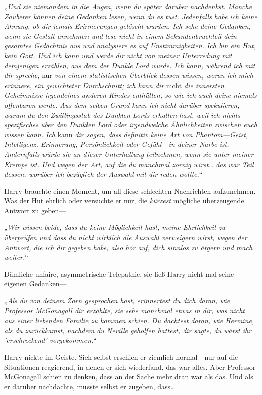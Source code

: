 {„\emph{Und sie niemandem in die Augen, wenn du später darüber nachdenkst. Manche Zauberer können deine Gedanken lesen, wenn du es tust. Jedenfalls habe ich keine Ahnung, ob dir jemals Erinnerungen gelöscht wurden. Ich sehe deine Gedanken, wenn sie Gestalt annehmen und lese nicht in einem Sekundenbruchteil dein gesamtes Gedächtnis aus und analysiere es auf Unstimmigkeiten. Ich bin ein Hut, kein Gott. Und ich kann und werde dir nicht von meiner Unterredung mit demjenigen erzählen, aus dem der Dunkle Lord wurde. Ich kann, während ich mit dir spreche,} nur \emph{von einem statistischen Überblick dessen wissen, woran ich mich erinnere, ein gewichteter Durchschnitt; ich kann dir} nicht \emph{die innersten Geheimnisse irgendeines anderen Kindes enthüllen, so wie ich} \emph{auch deine niemals offenbaren werde. Aus dem selben Grund kann ich nicht darüber spekulieren, warum du den Zwillingsstab des Dunklen Lords erhalten hast, weil ich nichts spezifisches über den Dunklen Lord oder irgendwelche Ähnlichkeiten zwischen euch wissen kann. Ich} kann \emph{dir sagen, dass definitiv keine Art von Phantom—Geist, Intelligenz, Erinnerung, Persönlichkeit oder Gefühl—in deiner Narbe ist. Andernfalls würde sie an dieser Unterhaltung teilnehmen, wenn sie unter meiner Krempe ist. Und wegen der Art, auf die du manchmal zornig wirst… das war Teil dessen, worüber ich bezüglich der Auswahl mit dir reden wollte.}“

Harry brauchte einen Moment, um all diese schlechten Nachrichten aufzunehmen. Was der Hut ehrlich oder versuchte er nur, die \emph{kürzest} mögliche überzeugende Antwort zu geben—

„\emph{Wir wissen beide, dass du keine Möglichkeit hast, meine Ehrlichkeit zu überprüfen und dass du nicht wirklich die Auswahl verweigern wirst, wegen der Antwort, die ich dir gegeben habe, also hör auf, dich sinnlos zu ärgern und mach weiter.}“

Dämliche unfaire, asymmetrische Telepathie, sie ließ Harry nicht mal seine eigenen Gedanken—

„\emph{Als du von deinem Zorn gesprochen hast, erinnertest du dich daran, wie Professor McGonagall dir erzählte, sie sehe manchmal etwas in dir, was nicht aus einer liebenden Familie zu kommen schien. Du dachtest daran, wie Hermine, als du zurückkamst, nachdem du Neville geholfen hattest, dir sagte, du wärst ihr 'erschreckend' vorgekommen.}“

Harry nickte im Geiste. Sich selbst erschien er ziemlich normal—nur auf die Situationen reagierend, in denen er sich wiederfand, das war alles. Aber Professor McGonagall schien zu denken, dass an der Sache mehr dran war als das. Und als er darüber nachdachte, musste selbst er zugeben, dass…

}

